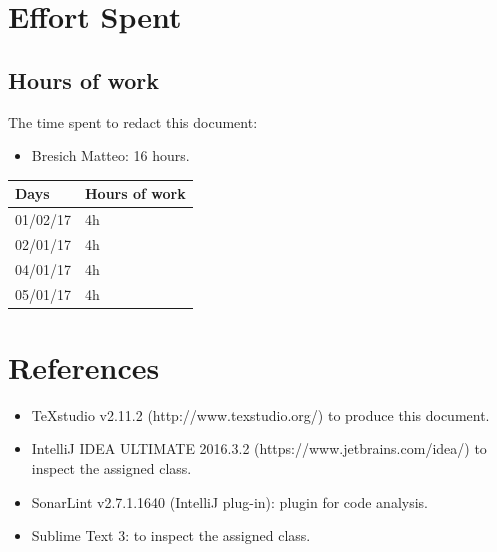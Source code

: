 \documentclass{article}
\begin{document}
	\section{Effort Spent}
		\subsection{Hours of work} The time spent to redact this document:
		\begin{itemize}
			\item Bresich Matteo: 16 hours.
		\end{itemize}
		
		\begin{center}
			\begin{tabular}{ | l | l |}
				\hline
				Days & Hours of work\\ \hline
				01/02/17 & 4h\\\hline
				02/01/17 & 4h\\\hline
				04/01/17 & 4h\\\hline
				05/01/17 & 4h\\\hline
			\end{tabular}
		\end{center}
	\section{References}
		\begin{itemize}
			\item TeXstudio v2.11.2 (http://www.texstudio.org/) to produce this document.
			\item IntelliJ IDEA ULTIMATE 2016.3.2 (https://www.jetbrains.com/idea/) to inspect the assigned class.
			\item SonarLint v2.7.1.1640 (IntelliJ plug-in): plugin for code analysis.
			\item Sublime Text 3: to inspect the assigned class.
		\end{itemize}
	
\end{document}
